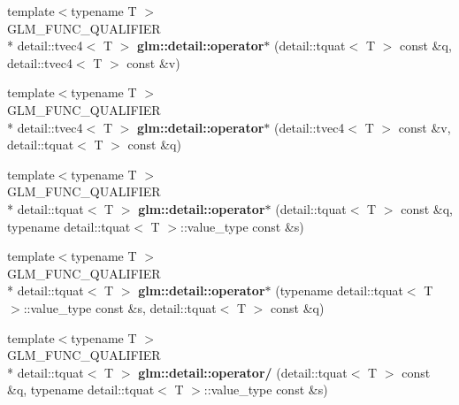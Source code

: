 \begin{DoxyCompactItemize}
\item 
\hypertarget{namespaceglm_1_1detail_a545f7ff9c0237b044aa7afbaeea454a6}{{\footnotesize template$<$typename T $>$ }\\G\-L\-M\-\_\-\-F\-U\-N\-C\-\_\-\-Q\-U\-A\-L\-I\-F\-I\-E\-R \\*
detail\-::tvec4$<$ T $>$ {\bfseries glm\-::detail\-::operator$\ast$} (detail\-::tquat$<$ T $>$ const \&q, detail\-::tvec4$<$ T $>$ const \&v)}\label{namespaceglm_1_1detail_a545f7ff9c0237b044aa7afbaeea454a6}

\item 
\hypertarget{namespaceglm_1_1detail_a05fb6dd823cc933828159a865d0e82c7}{{\footnotesize template$<$typename T $>$ }\\G\-L\-M\-\_\-\-F\-U\-N\-C\-\_\-\-Q\-U\-A\-L\-I\-F\-I\-E\-R \\*
detail\-::tvec4$<$ T $>$ {\bfseries glm\-::detail\-::operator$\ast$} (detail\-::tvec4$<$ T $>$ const \&v, detail\-::tquat$<$ T $>$ const \&q)}\label{namespaceglm_1_1detail_a05fb6dd823cc933828159a865d0e82c7}

\item 
\hypertarget{namespaceglm_1_1detail_a8cc37205ec17ddd9c7ab8d7ad1485911}{{\footnotesize template$<$typename T $>$ }\\G\-L\-M\-\_\-\-F\-U\-N\-C\-\_\-\-Q\-U\-A\-L\-I\-F\-I\-E\-R \\*
detail\-::tquat$<$ T $>$ {\bfseries glm\-::detail\-::operator$\ast$} (detail\-::tquat$<$ T $>$ const \&q, typename detail\-::tquat$<$ T $>$\-::value\-\_\-type const \&s)}\label{namespaceglm_1_1detail_a8cc37205ec17ddd9c7ab8d7ad1485911}

\item 
\hypertarget{namespaceglm_1_1detail_aa87e70463fba0101b49aea5d50ff9c0e}{{\footnotesize template$<$typename T $>$ }\\G\-L\-M\-\_\-\-F\-U\-N\-C\-\_\-\-Q\-U\-A\-L\-I\-F\-I\-E\-R \\*
detail\-::tquat$<$ T $>$ {\bfseries glm\-::detail\-::operator$\ast$} (typename detail\-::tquat$<$ T $>$\-::value\-\_\-type const \&s, detail\-::tquat$<$ T $>$ const \&q)}\label{namespaceglm_1_1detail_aa87e70463fba0101b49aea5d50ff9c0e}

\item 
\hypertarget{namespaceglm_1_1detail_a47775e56016984a714086b0d4e1dc673}{{\footnotesize template$<$typename T $>$ }\\G\-L\-M\-\_\-\-F\-U\-N\-C\-\_\-\-Q\-U\-A\-L\-I\-F\-I\-E\-R \\*
detail\-::tquat$<$ T $>$ {\bfseries glm\-::detail\-::operator/} (detail\-::tquat$<$ T $>$ const \&q, typename detail\-::tquat$<$ T $>$\-::value\-\_\-type const \&s)}\label{namespaceglm_1_1detail_a47775e56016984a714086b0d4e1dc673}


\end{DoxyCompactItemize}
